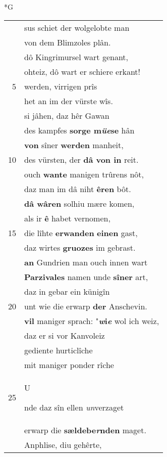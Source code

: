 \documentclass[8pt,a4paper,notitlepage]{article}
\begin{document}
\newpage
\begin{table}[ht]
\begin{minipage}[t]{0.5\linewidth}
\small
\begin{center}*G
\end{center}
\begin{tabular}{rl}
 & sus schiet der wolgelobte man\\ 
 & von dem Blimzoles plân.\\ 
 & dô Kingrimursel wart genant,\\ 
 & ohteiz, dô wart er schiere erkant!\\ 
5 & werden, virrigen prîs\\ 
 & het an im der vürste wîs.\\ 
 & si jâhen, daz hêr Gawan\\ 
 & des kampfes \textbf{sorge m\textit{üe}se} hân\\ 
 & \textbf{von} sîner \textbf{werden} manheit,\\ 
10 & des vürsten, der \textbf{dâ von in} reit.\\ 
 & ouch \textbf{wante} manigen trûrens nôt,\\ 
 & daz man im dâ niht \textbf{êren} bôt.\\ 
 & \textbf{dâ wâren} solhiu mære komen,\\ 
 & als ir \textbf{ê} habet vernomen,\\ 
15 & die lîhte \textbf{erwanden} \textbf{einen} gast,\\ 
 & daz wirtes \textbf{gruozes} im gebrast.\\ 
 & \textbf{an} Gundrien man ouch innen wart\\ 
 & \textbf{Parzivales} namen unde \textbf{sîner} art,\\ 
 & daz in gebar ein künigîn\\ 
20 & unt wie die erwarp \textbf{der} Anschevin.\\ 
 & \textbf{vil} maniger sprach: "\textbf{\textit{w}i\textit{e}} wol ich weiz,\\ 
 & daz er si vor Kanvoleiz\\ 
 & gediente hurticlîche\\ 
 & mit maniger ponder rîche\\ 
25 & \begin{large}U\end{large}nde daz sîn ellen \textit{un}verzaget\\ 
 & erwarp die \textbf{sældebe\textit{r}nden} maget.\\ 
 & Anphlise, diu gehêrte,\\ 

\end{tabular}
\end{minipage}
\end{table}
\end{document}
